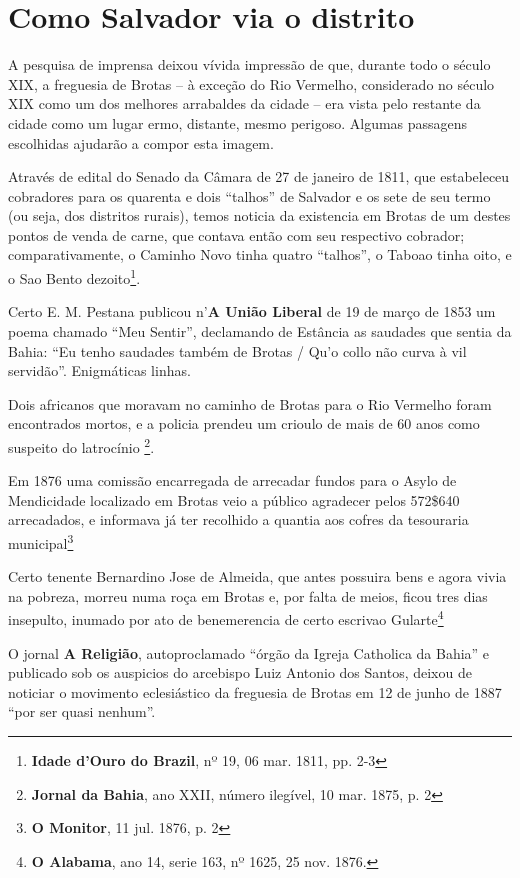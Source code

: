 \section{Como Salvador via o distrito}\label{sec:2.5}

A pesquisa de imprensa deixou vívida impressão de que, durante todo o século XIX, a freguesia de Brotas -- à exceção do Rio Vermelho, considerado no século XIX como um dos melhores arrabaldes da cidade -- era vista pelo restante da cidade como um lugar ermo, distante, mesmo perigoso. Algumas passagens escolhidas ajudarão a compor esta imagem.

Através de edital do Senado da Câmara de 27 de janeiro de 1811, que estabeleceu cobradores para os quarenta e dois ``talhos'' de Salvador e os sete de seu termo (ou seja, dos distritos rurais), temos noticia da existencia em Brotas de um destes pontos de venda de carne, que contava então com seu respectivo cobrador; comparativamente, o Caminho Novo tinha quatro ``talhos'', o Taboao tinha oito, e o Sao Bento dezoito\footnote{\textbf{Idade d'Ouro do Brazil}, nº 19, 06 mar. 1811, pp. 2-3}.

Certo E. M. Pestana publicou n'\textbf{A União Liberal} de 19 de março de 1853 um poema chamado ``Meu Sentir'', declamando de Estância as saudades que sentia da Bahia: ``Eu tenho saudades também de Brotas / Qu'o collo não curva à vil servidão''. Enigmáticas linhas.

Dois africanos que moravam no caminho de Brotas para o Rio Vermelho foram encontrados mortos, e a policia prendeu um crioulo de mais de 60 anos como suspeito do latrocínio \footnote{\textbf{Jornal da Bahia}, ano XXII, número ilegível, 10 mar. 1875, p. 2}.

Em 1876 uma comissão encarregada de arrecadar fundos para o Asylo de Mendicidade localizado em Brotas veio a público agradecer pelos 572\$640 arrecadados, e informava já ter recolhido a quantia aos cofres da tesouraria municipal\footnote{\textbf{O Monitor}, 11 jul. 1876, p. 2}

Certo tenente Bernardino Jose de Almeida, que antes possuira bens e agora vivia na pobreza, morreu numa roça em Brotas e, por falta de meios, ficou tres dias insepulto, inumado por ato de benemerencia de certo escrivao Gularte\footnote{\textbf{O Alabama}, ano 14, serie 163, nº 1625, 25 nov. 1876.}

O jornal \textbf{A Religião}, autoproclamado ``órgão da Igreja Catholica da Bahia'' e publicado sob os auspicios do arcebispo Luiz Antonio dos Santos, deixou de noticiar o movimento eclesiástico da freguesia de Brotas em 12 de junho de 1887 ``por ser quasi nenhum''.

